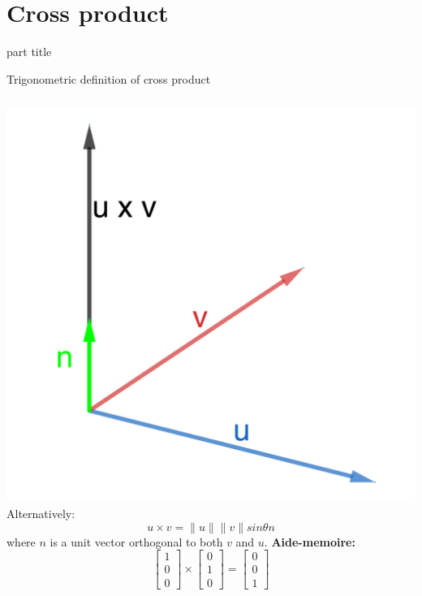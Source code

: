 \documentclass{beamer}
\begin{document}
\section{Cross product}

\begin{frame}
\begin{beamercolorbox}[sep=12pt,center]{part title}
\insertsection\par
\end{beamercolorbox}
\end{frame}

\begin{frame}{Trigonometric definition of cross product}
\begin{columns}
  \includegraphics{cross-product-direction.png}
  Alternatively:
  \begin{equation*}
  u\times v = \|u\|\|v\| sin\theta n
  \end{equation*}
  where $n$ is a unit vector orthogonal to both $v$ and $u$.\vfill
  {\bf Aide-memoire:}
  \begin{equation*}
  \left[
  \begin{array}{c}
  1\\
  0\\
  0
  \end{array}
  \right]\times \left[
  \begin{array}{c}
  0\\
  1\\
  0
  \end{array}
  \right] = \left[
  \begin{array}{c}
  0\\
  0\\
  1
  \end{array}
  \right]
  \end{equation*}
\end{columns}
\end{frame}
\end{document}
